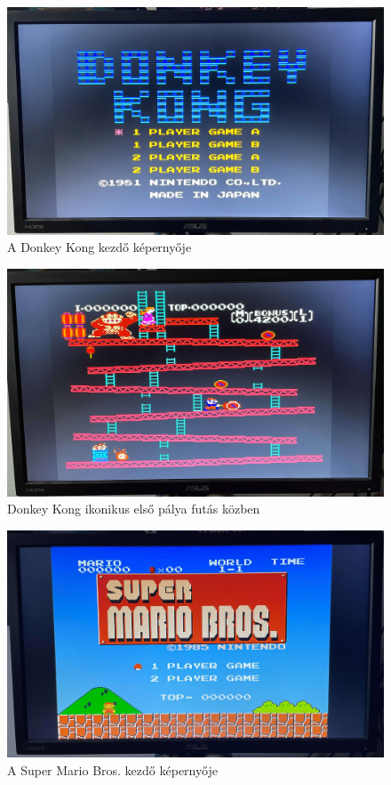\begin{figure}[H]
	\centering
	\includegraphics[width=150mm, keepaspectratio]{figures/Donkey-start}
	\caption{A Donkey Kong kezdő képernyője} 
	\label{fig:Donkey-start}
\end{figure}

\begin{figure}[H]
	\centering
	\includegraphics[width=150mm, keepaspectratio]{figures/Donkey-level-1}
	\caption{Donkey Kong ikonikus első pálya futás közben} 
	\label{fig:Donkey-level-1}
\end{figure}

\begin{figure}[H]
	\centering
	\includegraphics[width=150mm, keepaspectratio]{figures/Super-Mario_Start-croped}
	\caption{A Super Mario Bros. kezdő képernyője} 
	\label{fig:Super-Mario-start}
\end{figure}

